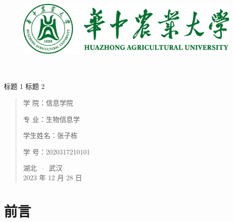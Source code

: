 \documentclass[UTF8]{ctexart}
\date{}
\begin{document}
	\begin{figure}[t]
		\centering
        \includegraphics[scale=0.7]{img/HZAU.png}
	\end{figure}

	\begin{center}
		\quad \\
		\quad \\
		\heiti \fontsize{45}{17} 标题 1
		\vskip 3.5cm
		\heiti {} 标题 2
	\end{center}
	\vskip 3.5cm

	\begin{quotation}
		\heiti \fontsize{15}{15}
		\doublespacing
		\par\setlength\parindent{12em}
		\quad

		学\hspace{0.61cm} 院：信息学院

		专\hspace{0.61cm} 业：生物信息学

		学生姓名：张子栋

		学\hspace{0.61cm} 号：2020317210101


		\vskip 1.5cm
		\centering
        湖北~·~武汉\\
		2023 年 12 月 28 日
	\end{quotation}

	\newpage

    \tableofcontents
    
    \setcounter{page}{0}

    \thispagestyle{empty}

    \newpage

	\section{前言}
	
	\begin{thebibliography}{99}
		
	\end{thebibliography}
\end{document}
